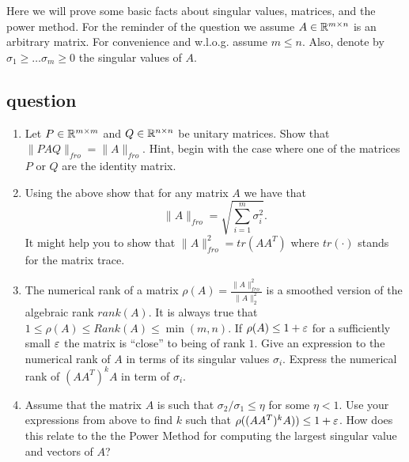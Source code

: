 \documentclass{article}
\begin{document}
Here we will prove some basic facts about singular values, matrices, and the power method.
For the reminder of the question we assume $A \in {\mathbb{R}}^{m \times n}$ is an arbitrary matrix.
For convenience and w.l.o.g. assume $m \le n$. Also, denote by $\sigma_1 \ge \ldots \sigma_m \ge 0$
the singular values of $A$.
\subsection*{question}

\begin{enumerate}
\item Let $P \in {\mathbb{R}}^{m \times m}$ and $Q \in {\mathbb{R}}^{n \times n}$ be unitary matrices.
Show that $\|PAQ\|_{fro} = \|A\|_{fro}$.
Hint, begin with the case where one of the matrices $P$ or $Q$ are the identity matrix.
\item Using the above show that for any matrix $A$ we have that 
\[
\|A\|_{fro} = \sqrt{\sum_{i=1}^{m}\sigma_{i}^{2}}.
\]
It might help you to show that $\|A\|^{2}_{fro} = tr(AA^T)$ where $tr(\cdot)$ stands for the matrix trace.
\item The numerical rank of a matrix $\rho(A) = \frac{\|A\|^{2}_{fro}}{\|A\|^2_2}$ is a smoothed
version of the algebraic rank $rank(A)$. It is always true that $1\le \rho(A) \le Rank(A) \le \min(m,n)$.
If $\rho(A) \le 1 +\varepsilon$ for a sufficiently small $\varepsilon$ the matrix is ``close'' to being of rank $1$.
Give an expression to the numerical rank of $A$ in terms of its
singular values $\sigma_i$. Express the numerical rank of $(AA^T)^{k}A$ in term of  $\sigma_i$.
\item Assume that the matrix $A$ is such that $\sigma_2/\sigma_1 \le \eta$ for some $\eta < 1$.
Use your expressions from above to find $k$ such that $\rho((AA^T)^{k}A)) \le  1+ \varepsilon$.
How does this relate to the the Power Method for computing the largest singular value and vectors of $A$?
\end{enumerate}
\end{document}
